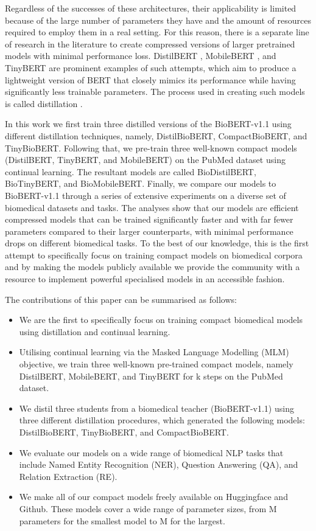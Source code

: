 \documentclass{article}
\begin{document}
Regardless of the successes of these architectures, their applicability is limited because of the large number of parameters they have and the amount of resources required to employ them in a real setting. For this reason, there is a separate line of research in the literature to create compressed versions of larger pretrained models with minimal performance loss. DistilBERT \citep{sanh2019distilbert}, MobileBERT \citep{sun-etal-2020-mobilebert}, and TinyBERT \citep{jiao-etal-2020-tinybert} are prominent examples of such attempts, which aim to produce a lightweight version of BERT that closely mimics its performance while having significantly less trainable parameters. The process used in creating such models is called distillation \citep{hinton2015distilling}. 




In this work we first train three distilled versions of the BioBERT-v1.1 using different distillation techniques, namely, DistilBioBERT, CompactBioBERT, and TinyBioBERT. Following that, we pre-train three well-known compact models (DistilBERT, TinyBERT, and MobileBERT) on the PubMed dataset using continual learning. The resultant models are called BioDistilBERT, BioTinyBERT, and BioMobileBERT. Finally, we compare our models to BioBERT-v1.1 through a series of extensive experiments on a diverse set of biomedical datasets and tasks. The analyses show that our models are efficient compressed models that can be trained significantly faster and with far fewer parameters compared to their larger counterparts, with minimal performance drops on different biomedical tasks. To the best of our knowledge, this is the first attempt to specifically focus on training compact models on biomedical corpora and by making the models publicly available we provide the community with a resource to implement powerful specialised models in an accessible fashion.     

The contributions of this paper can be summarised as follows:

\begin{itemize}
    \item We are the first to specifically focus on training compact biomedical models using distillation and continual learning.
    \item Utilising continual learning via the Masked Language Modelling (MLM) objective, we train three well-known pre-trained compact models, namely DistilBERT, MobileBERT, and TinyBERT for k steps on the PubMed dataset.
    \item We distil three students from a biomedical teacher (BioBERT-v1.1) using three different distillation procedures, which generated the following models: DistilBioBERT, TinyBioBERT, and CompactBioBERT. 
    \item We evaluate our models on a wide range of biomedical NLP tasks that include Named Entity Recognition (NER), Question Answering (QA), and Relation Extraction (RE).    
    \item We make all of our  compact models freely available on Huggingface and Github. These models cover a wide range of parameter sizes, from M parameters for the smallest model to M for the largest. 
\end{itemize}
\end{document}
